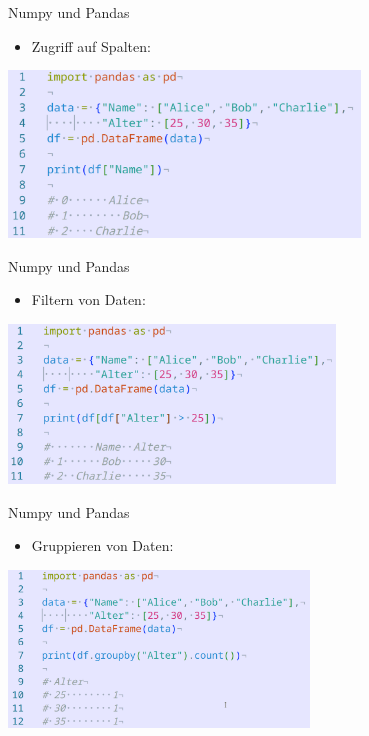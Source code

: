 \documentclass[aspectratio=169]{beamer}
\begin{document}
\begin{frame}{Numpy und Pandas}
    \begin{itemize}
        \item Zugriff auf Spalten:
    \end{itemize}
    \begin{tcolorbox}[colframe=oxfordblue, colback=blue!10, coltitle=white, title=Python]
        \includegraphics[width=0.7\textwidth]{images/code_pandasfiltercolumn.png}
    \end{tcolorbox}
\end{frame}

\begin{frame}{Numpy und Pandas}
    \begin{itemize}
        \item Filtern von Daten:
        \end{itemize}
    \begin{tcolorbox}[colframe=oxfordblue, colback=blue!10, coltitle=white, title=Python]
        \includegraphics[width=0.65\textwidth]{images/code_pandasfilterdata.png}
    \end{tcolorbox}
\end{frame}

\begin{frame}{Numpy und Pandas}
    \begin{itemize}
        \item Gruppieren von Daten:
        \end{itemize}
    \begin{tcolorbox}[colframe=oxfordblue, colback=blue!10, coltitle=white, title=Python]
        \includegraphics[width=0.6\textwidth]{images/code_pandasgroupadata.png}
    \end{tcolorbox}
\end{frame}
\end{document}
